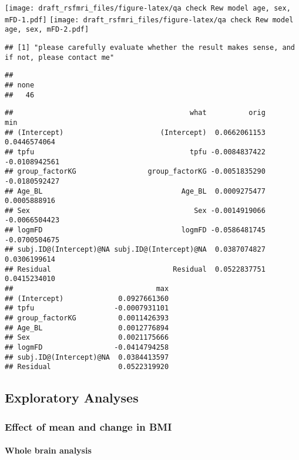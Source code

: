 \documentclass[
]{article}
\begin{document}
\texttt{[image: draft\_rsfmri\_files/figure-latex/qa check Rew model age, sex, mFD-1.pdf]} \texttt{[image: draft\_rsfmri\_files/figure-latex/qa check Rew model age, sex, mFD-2.pdf]}

\begin{verbatim}
## [1] "please carefully evaluate whether the result makes sense, and if not, please contact me"
\end{verbatim}

\begin{verbatim}
## 
## none 
##   46
\end{verbatim}

\begin{verbatim}
##                                          what          orig           min
## (Intercept)                       (Intercept)  0.0662061153  0.0446574064
## tpfu                                     tpfu -0.0084837422 -0.0108942561
## group_factorKG                 group_factorKG -0.0051835290 -0.0180592427
## Age_BL                                 Age_BL  0.0009275477  0.0005888916
## Sex                                       Sex -0.0014919066 -0.0066504423
## logmFD                                 logmFD -0.0586481745 -0.0700504675
## subj.ID@(Intercept)@NA subj.ID@(Intercept)@NA  0.0387074827  0.0306199614
## Residual                             Residual  0.0522837751  0.0415234010
##                                  max
## (Intercept)             0.0927661360
## tpfu                   -0.0007931101
## group_factorKG          0.0011426393
## Age_BL                  0.0012776894
## Sex                     0.0021175666
## logmFD                 -0.0414794258
## subj.ID@(Intercept)@NA  0.0384413597
## Residual                0.0522319920
\end{verbatim}

\hypertarget{exploratory-analyses}{%
\subsection{Exploratory Analyses}\label{exploratory-analyses}}

\hypertarget{effect-of-mean-and-change-in-bmi}{%
\subsubsection{Effect of mean and change in BMI}\label{effect-of-mean-and-change-in-bmi}}

\hypertarget{whole-brain-analysis}{%
\paragraph{Whole brain analysis}\label{whole-brain-analysis}}
\end{document}
